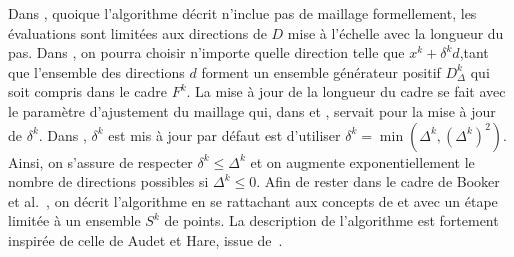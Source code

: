 Dans \GPS, quoique l'algorithme décrit n'inclue pas de maillage formellement, les évaluations sont limitées aux directions de $D$ mise à l'échelle avec la longueur du pas. Dans \MADS, on pourra choisir n'importe quelle direction telle que $x^k + \delta^k d$,tant que l'ensemble des directions $d$ forment un ensemble générateur positif $D_\Delta^k$ qui soit compris dans le cadre $F^k$. La mise à jour de la longueur du cadre se fait avec le paramètre d'ajustement du maillage qui, dans \CS et \GPS, servait  pour la mise à jour de $\delta^k$. Dans \MADS, $\delta^k$ est mis à jour par défaut est d'utiliser $\delta^k = \min(\Delta^k, (\Delta^k)^2)$. Ainsi, on s'assure de respecter $\delta^k \leq \Delta^k$ et on augmente exponentiellement le nombre de directions possibles si $\Delta^k \leq 0$. Afin de rester dans le cadre de Booker et al.~\cite{BoDeFrSeToTr99a}, on décrit l'algorithme en se rattachant aux concepts de \POLL et \SEARCH avec un étape \SEARCH limitée à un ensemble $S^k$ de points.  La description de l'algorithme est fortement inspirée de celle de Audet et Hare, issue de~\cite{AuHa2018}. 
